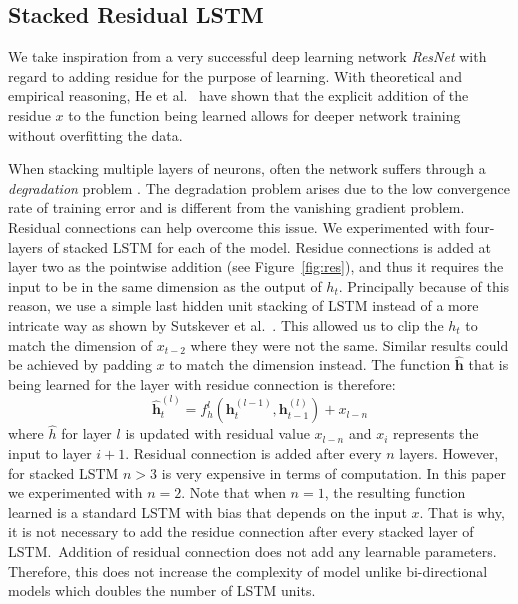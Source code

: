 \subsection{Stacked Residual LSTM}
We take inspiration from a very successful deep learning network \emph{ResNet} \cite{he2015deep} with regard to adding residue for the purpose of learning. With  theoretical and empirical reasoning, He et al.~\cite{he2015deep} have shown that the explicit addition of the residue $x$ to the function being learned allows
for deeper network training without overfitting the data.
 
When stacking multiple layers of neurons, often the network suffers through a \emph{degradation} problem \cite{he2015deep}. The degradation problem arises due to the low convergence rate of training error and is different from the vanishing gradient problem. Residual connections can help overcome this issue. We experimented with four-layers of stacked LSTM for each of the model. Residue connections is added at layer two as the pointwise addition (see Figure~\ref{fig:res}), and thus it requires the input to be in the same dimension as the output of $h_t$. Principally because of this reason, we use a simple last hidden unit stacking of LSTM instead of a more intricate way as shown by Sutskever et al.~\cite{SutskeverVL14}. This allowed us to clip the $h_t$ to match the dimension of $x_{t-2}$ where they were not the same. Similar results could be achieved by padding $x$ to match the dimension instead. The function $\bm{\hat{h}}$ that is being learned for the layer with residue connection is therefore:
$$
\bm{\hat{h}}_{t}^{(l)} = f_{h}^{l}(\bm{h}_{t}^{(l-1)}, \bm{h}_{t-1}^{(l)}) + x_{l-n}
$$
where $\hat{h}$ for layer $l$ is updated with residual value $x_{l-n} $ and $x_{i}$ represents the input to layer $i+1$. Residual connection is added after every $n$ layers. However, for stacked LSTM $n>3$ is very expensive in terms of computation. In this paper we experimented with $n=2$. Note that when $n=1$, the resulting function learned is a standard LSTM with bias that depends on the input $x$. That is why, it is not necessary to add the residue connection after every stacked layer of LSTM.\ Addition of residual connection does not add any learnable parameters. Therefore, this does not increase the complexity of model unlike bi-directional models which doubles the number of LSTM units.
